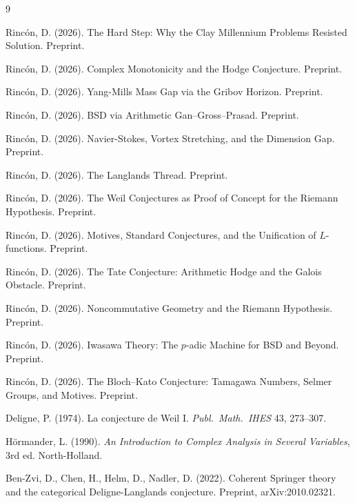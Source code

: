 \documentclass[12pt]{article}
\theoremstyle{definition}
\theoremstyle{remark}
\begin{document}
\begin{thebibliography}{9}

Rinc\'on, D. (2026).
The Hard Step: Why the Clay Millennium Problems Resisted Solution. Preprint.

Rinc\'on, D. (2026).
Complex Monotonicity and the Hodge Conjecture. Preprint.

Rinc\'on, D. (2026).
Yang-Mills Mass Gap via the Gribov Horizon. Preprint.

Rinc\'on, D. (2026).
BSD via Arithmetic Gan--Gross--Prasad. Preprint.

Rinc\'on, D. (2026).
Navier-Stokes, Vortex Stretching, and the Dimension Gap. Preprint.

Rinc\'on, D. (2026).
The Langlands Thread. Preprint.

Rinc\'on, D. (2026).
The Weil Conjectures as Proof of Concept for the Riemann Hypothesis. Preprint.

Rinc\'on, D. (2026).
Motives, Standard Conjectures, and the Unification of $L$-functions. Preprint.

Rinc\'on, D. (2026).
The Tate Conjecture: Arithmetic Hodge and the Galois Obstacle. Preprint.

Rinc\'on, D. (2026).
Noncommutative Geometry and the Riemann Hypothesis. Preprint.

Rinc\'on, D. (2026).
Iwasawa Theory: The $p$-adic Machine for BSD and Beyond. Preprint.

Rinc\'on, D. (2026).
The Bloch--Kato Conjecture: Tamagawa Numbers, Selmer Groups, and Motives.
Preprint.

Deligne, P. (1974).
La conjecture de Weil I.
\textit{Publ.\ Math.\ IHES} 43, 273--307.

H\"ormander, L. (1990).
\textit{An Introduction to Complex Analysis in Several Variables}, 3rd ed.
North-Holland.

Ben-Zvi, D., Chen, H., Helm, D., Nadler, D. (2022).
Coherent Springer theory and the categorical Deligne-Langlands conjecture.
Preprint, arXiv:2010.02321.

\end{thebibliography}
\end{document}
